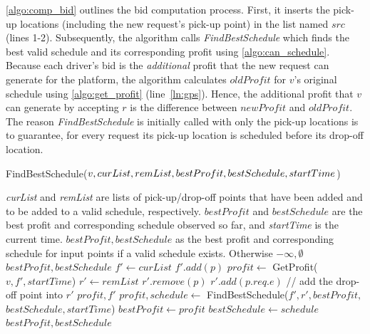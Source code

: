\cref{algo:comp_bid} outlines the bid computation process. First, it inserts the pick-up locations (including the new request's pick-up point) in the list named $src$ (lines 1-2). Subsequently, the algorithm calls \textit{FindBestSchedule} which finds the best valid schedule and its corresponding profit using \cref{algo:can_schedule}. Because each driver's bid is the \textit{additional} profit that the new request can generate for the platform, the algorithm calculates $oldProfit$ for $v$'s original schedule using \cref{algo:get_profit} (line~\ref{ln:gps}). Hence, the additional profit that $v$ can generate by accepting $r$ is the difference between $newProfit$ and $oldProfit$. The reason \textit{FindBestSchedule} is initially called with only the pick-up locations is to guarantee, for every request its pick-up location is scheduled before its drop-off location. 

\begin{algorithm}[!ht]
	\caption{FindBestSchedule($v, curList, remList,
		bestProfit,\\ bestSchedule, startTime$)}
	\label{algo:can_schedule}
	\begin{algorithmic}[1]
		\REQUIRE \emph{curList} and \emph{remList} are lists of pick-up/drop-off points that have been added and to be added to a valid schedule, respectively. ${bestProfit}$ and ${bestSchedule}$ are the best profit and corresponding schedule observed so far, and \emph{startTime} is the current time.
		\ENSURE $bestProfit, bestSchedule$ as the best profit and corresponding schedule for input points if a valid schedule exists. Otherwise $-\infty, \emptyset$
		\RETURN $bestProfit, bestSchedule$
		\ENDIF
		\STATE $f' \leftarrow curList$
		\STATE $f'.add(p)$
		\STATE $profit \leftarrow$ GetProfit($v, f', startTime$)
		\STATE $r' \leftarrow remList$
		\STATE $r'.remove(p)$
		\STATE  $r'.add(p.req.e)$  // add the drop-off point into $r'$\label{ln:dropoff}
		\ENDIF
		\RETURN $profit, f'$
		\ENDIF
		\STATE $profit, schedule \leftarrow$ FindBestSchedule($f', r', bestProfit,$\\ $bestSchedule, startTime$)
		\STATE $bestProfit \leftarrow profit$
		\STATE $bestSchedule \leftarrow schedule$
		\ENDIF
		\ENDIF
		\ENDFOR
		\RETURN $bestProfit, bestSchedule$
	\end{algorithmic} \vspace{-1mm}
\end{algorithm}

